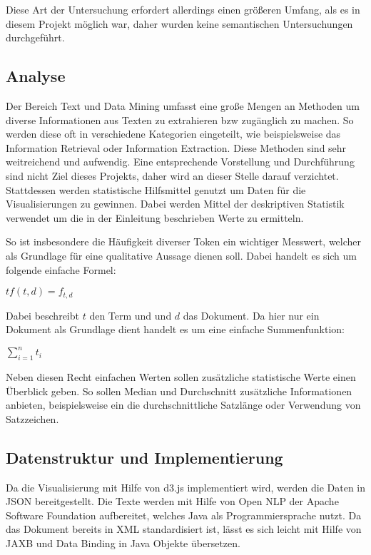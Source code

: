 Diese Art der Untersuchung erfordert allerdings einen größeren Umfang, als es in diesem Projekt möglich war, daher wurden keine semantischen Untersuchungen durchgeführt.

\subsection{Analyse}
Der Bereich Text und Data Mining umfasst eine große Mengen an Methoden um diverse Informationen aus Texten zu extrahieren bzw zugänglich zu machen. So werden diese oft in verschiedene Kategorien eingeteilt, wie beispielsweise das Information Retrieval oder Information Extraction. Diese Methoden sind sehr weitreichend und aufwendig. Eine entsprechende Vorstellung und Durchführung sind nicht Ziel dieses Projekts, daher wird an dieser Stelle darauf verzichtet.\\

Stattdessen werden statistische Hilfsmittel genutzt um Daten für die Visualisierungen zu gewinnen. Dabei werden Mittel der deskriptiven Statistik verwendet um die in der Einleitung beschrieben Werte zu ermitteln.

So ist insbesondere die Häufigkeit diverser Token ein wichtiger Messwert, welcher als Grundlage für eine qualitative Aussage dienen soll. Dabei handelt es sich um folgende einfache Formel:

$ tf(t,d) = f_{t,d} $

Dabei beschreibt $t$ den Term und und $d$ das Dokument. Da hier nur ein Dokument als Grundlage dient handelt es um eine einfache Summenfunktion:

$\sum_{i=1}^{n} t_i$

Neben diesen Recht einfachen Werten sollen zusätzliche statistische Werte einen Überblick geben. So sollen Median und Durchschnitt zusätzliche Informationen anbieten, beispielsweise ein die durchschnittliche Satzlänge oder Verwendung von Satzzeichen.

\subsection{Datenstruktur und Implementierung}
Da die Visualisierung mit Hilfe von d3.js implementiert wird, werden die Daten in JSON bereitgestellt. Die Texte werden mit Hilfe von Open NLP der Apache Software Foundation aufbereitet, welches Java als Programmiersprache nutzt. Da das Dokument bereits in XML standardisiert ist, lässt es sich leicht mit Hilfe von JAXB und Data Binding in Java Objekte übersetzen. \\

